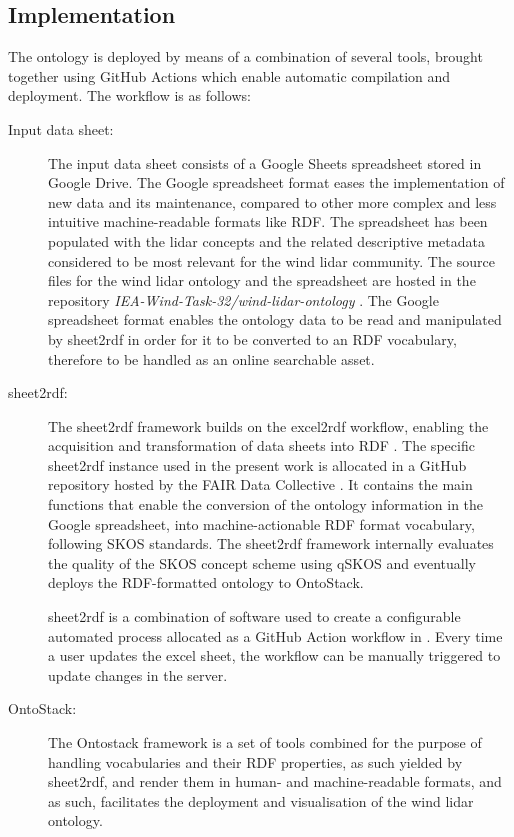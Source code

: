 \documentclass[remotesensing,article,submit,pdftex,moreauthors]{Definitions/mdpi}
\begin{document}
\subsection{Implementation}
\label{subsec:implementation}
The ontology is deployed by means of a combination of several tools, brought together using GitHub Actions which enable automatic compilation and deployment. The workflow is as follows: 
\begin{description}
    
    \item [Input data sheet:] The input data sheet consists of a Google Sheets spreadsheet stored in Google Drive. The Google spreadsheet format eases the implementation of new data and its maintenance, compared to other more complex and less intuitive machine-readable formats like RDF. The spreadsheet has been populated with the lidar concepts and the related descriptive metadata considered to be most relevant for the wind lidar community. The source files for the wind lidar ontology and the spreadsheet are hosted in the repository  \textit{IEA-Wind-Task-32/wind-lidar-ontology} \cite{ref-IEA-Wind-Task-32-wind-lidar-ontology}.
    The Google spreadsheet format enables the ontology data to be read and manipulated by sheet2rdf in order for it to be converted to an RDF vocabulary, therefore to be handled as an online searchable asset. 
    
    \item [sheet2rdf:] The sheet2rdf framework builds on the excel2rdf \cite{ref-excel2rdf} workflow, enabling the acquisition and transformation of data sheets into RDF \cite{ref-sheet2rdf}. The specific sheet2rdf instance used in the present work is allocated in a GitHub repository \cite{ref-FAIRsheet2rdf} hosted by the FAIR Data Collective \cite{}. It contains the main functions that enable the conversion of the ontology information in the Google spreadsheet, into machine-actionable RDF format vocabulary, following SKOS standards. The sheet2rdf framework internally evaluates the quality of the SKOS concept scheme using qSKOS \cite{ref-W3C-qSKOS} and eventually deploys the RDF-formatted ontology to OntoStack. 
    
    sheet2rdf is a combination of software used to create a configurable automated process allocated as a GitHub Action workflow in \cite{ref-FAIRsheet2rdf}. Every time a user updates the excel sheet, the workflow can be manually triggered to update changes in the server.
    
    \item [OntoStack:] The Ontostack framework is a set of tools combined for the purpose of handling vocabularies and their RDF properties, as such yielded by sheet2rdf, and render them in human- and machine-readable formats, and as such, facilitates the deployment and visualisation of the wind lidar ontology.
    

\end{description}
\end{document}
